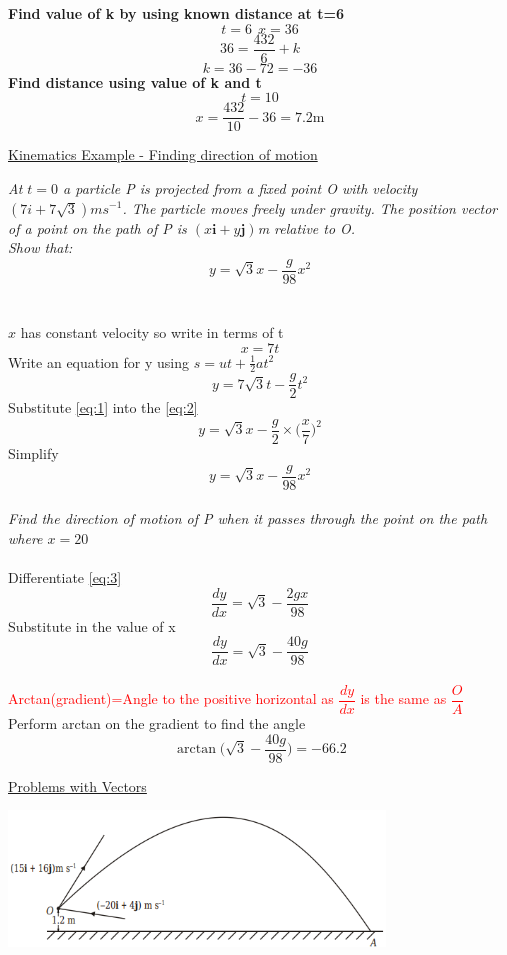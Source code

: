 \documentclass{article}[18pt]
\begin{document}
\textbf{Find value of k by using known distance at t=6}
$$t=6 \ \ x=36$$
$$36=\dfrac{432}{6}+k$$
$$k=36-72=-36$$
\textbf{Find distance using value of k and t}
$$t=10$$
$$x=\dfrac{432}{10}-36=7.2\text{m}$$
\newpage
\begin{center}
\underline{\huge Kinematics Example - Finding direction of motion}
\end{center}
\textit{At $t=0$ a particle P is projected from a fixed point O with velocity $(7i+7\sqrt{3})ms^{-1}$. The particle moves freely under gravity. The position vector of a point on the path of P is $(x\mathbf{i}+y\mathbf{j})$m relative to O.}\\
\textit{Show that:}
$$y=\sqrt{3}x-\frac{g}{98}x^2$$
\\
\\
$x$ has constant velocity so write in terms of t
\begin{equation}\label{eq:1}
x=7t
\end{equation}
Write an equation for y using $s=ut+\frac{1}{2}at^2$
\begin{equation}\label{eq:2}
y=7\sqrt{3}t-\frac{g}{2}t^2
\end{equation}
Substitute \eqref{eq:1} into the \eqref{eq:2}
$$y=\sqrt{3}x-\frac{g}{2}\times\Big(\frac{x}{7}\Big)^2$$
Simplify
\begin{equation}\label{eq:3}
y=\sqrt{3}x-\frac{g}{98}x^2
\end{equation}
\\
\textit{Find the direction of motion of P when it passes through the point on the path where $x=20$}\\
\\
Differentiate \eqref{eq:3}
$$\frac{dy}{dx}=\sqrt{3}-\frac{2gx}{98}$$
Substitute in the value of x
$$\frac{dy}{dx}=\sqrt{3}-\frac{40g}{98}$$
\\
\textcolor{red}{Arctan(gradient)=Angle to the positive horizontal as $\dfrac{dy}{dx}$ is the same as $\dfrac{O}{A}$
}
\\
Perform arctan on the gradient to find the angle
$$\arctan\Big(\sqrt{3}-\frac{40g}{98}\Big)=-66.2$$
\newpage
\begin{center}
\underline{\Huge Problems with Vectors}
\end{center}
\includegraphics[width=10cm]{vector_problems.png}\\
\end{document}
